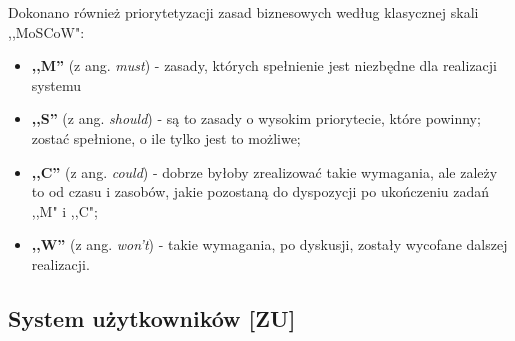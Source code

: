 Dokonano
również priorytetyzacji zasad biznesowych według klasycznej skali ,,MoSCoW":

\begin{itemize}
	\item \textbf{,,M''} (z ang. \textit{must}) - zasady, których spełnienie jest niezbędne dla realizacji systemu
	\item \textbf{,,S''} (z ang. \textit{should}) - są to zasady o wysokim priorytecie, które powinny;
	zostać spełnione, o ile tylko jest to możliwe;
	\item \textbf{,,C''} (z ang. \textit{could}) - dobrze byłoby zrealizować takie wymagania, ale zależy to od czasu
	i zasobów, jakie pozostaną do dyspozycji po ukończeniu zadań ,,M" i ,,C";
	\item \textbf{,,W''} (z ang. \textit{won't}) - takie wymagania, po dyskusji, zostały wycofane dalszej realizacji.
\end{itemize}

\newpage

\subsection{System użytkowników [ZU]}

\leavevmode\hbox{}

